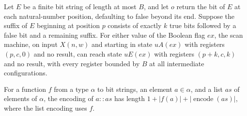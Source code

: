 \begin{lemma}
\label{BoolCircuit.AdjScan.uloop}
\leanok
{}
Let $E$ be a finite bit string of length at most $B$, and let $o$ return the bit of $E$
at each natural-number position, defaulting to false beyond its end. Suppose the suffix
of $E$ beginning at position $p$ consists of exactly $k$ true bits followed by a false
bit and a remaining suffix. For either value of the Boolean flag $ex$, the scan machine,
on input $X(n,w)$ and starting in state $uA(ex)$ with registers $(p,c,0)$ and no result,
can reach state $uE(ex)$ with registers $(p+k,c,k)$ and no result, with every register
bounded by $B$ at all intermediate configurations.
\end{lemma}

\begin{lemma}
\label{BoolCircuit.AdjScan.length_encodeList_cons}
\leanok
{}
For a function $f$ from a type $\alpha$ to bit strings, an element $a\in\alpha$, and a
list $as$ of elements of $\alpha$, the encoding of $a::as$ has length
$1+|f(a)|+|\operatorname{encode}(as)|$, where the list encoding uses $f$.
\end{lemma}

